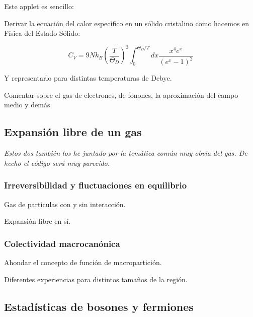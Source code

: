 \documentclass[11pt, a4paper]{article} %
\theoremstyle{named}
\begin{document}
            Este applet es sencillo:

            Derivar la ecuación del calor específico en un sólido cristalino como hacemos en Física del Estado Sólido:

            $$
            C_{V}=9 N k_{B}\left(\frac{T}{\Theta_{D}}\right)^{3} \int_{0}^{\Theta_{D} / T} d x \frac{x^{4} e^{x}}{\left(e^{x}-1\right)^{2}}
            $$

            Y representarlo para distintas temperaturas de Debye.

            Comentar sobre el gas de electrones, de fonones, la aproximación del campo medio y demás.


    \newpage
    \subsection{Expansión libre de un gas}\label{sec:gases}

        \textit{Estos dos también los he juntado por la temática común muy obvia del gas. De hecho el código será muy  parecido.}

        \subsubsection{Irreversibilidad y fluctuaciones en equilibrio}\label{sec:equilibrio}

            Gas de particulas con y sin interacción.

            Expansión libre en sí.

        \subsubsection{Colectividad macrocanónica}\label{sec:macrocanonica}

            Ahondar el concepto de función de macropartición.

            Diferentes experiencias para distintos tamaños de la región.

    \newpage
    \subsection{Estadísticas de bosones y fermiones}\label{sec:bosefermi}
\end{document}
